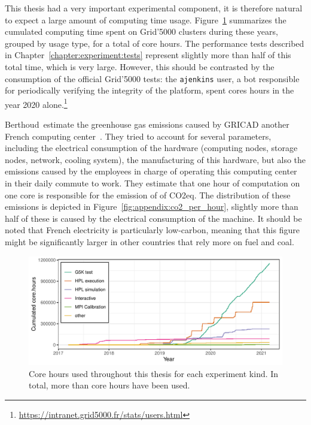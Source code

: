         This thesis had a very important experimental component, it is therefore natural to expect a large amount of
        computing time usage. Figure~\ref{fig:appendix:node_hours} summarizes the cumulated computing time spent on
        Grid'5000 clusters during these years, grouped by usage type, for a total of  core hours. The
        performance tests described in Chapter~\ref{chapter:experiment:tests} represent slightly more than half of this
        total time, which is very large. However, this should be contrasted by the consumption of the official Grid'5000
        tests: the \texttt{ajenkins} user, a bot responsible for periodically verifying the integrity of the platform,
        spent  cores hours in the year 2020
        alone.\footnote{\url{https://intranet.grid5000.fr/stats/users.html}}

        Berthoud~\etal estimate the greenhouse gas emissions caused by GRICAD another French computing
        center~\cite{corehour_co2}. They tried to account for several parameters, including the electrical consumption
        of the hardware (computing nodes, storage nodes, network, cooling system), the manufacturing of this hardware,
        but also the emissions caused by the employees in charge of operating this computing center in their daily
        commute to work. They estimate that one hour of computation on one core is responsible for the emission of
         of CO2eq. The distribution of these emissions is depicted in
        Figure~\ref{fig:appendix:co2_per_hour}, slightly more than half of these  is caused by the
        electrical consumption of the machine. It should be noted that French electricity is particularly low-carbon,
        meaning that this figure might be significantly larger in other countries that rely more on fuel and coal.

        \begin{figure}[tpb]
            \centering
            \includegraphics[width=\linewidth]{img/appendix/carbon/node_hours.pdf}
            \caption{Core hours used throughout this thesis for each experiment kind. In total, more than
             core hours have been used.}%
            \label{fig:appendix:node_hours}
        \end{figure}

